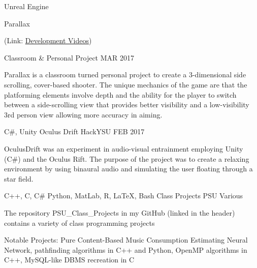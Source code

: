 
\vspace{-.5em}
\begin{cventries}

	\cventry
	{{\color{awesome} Unreal Engine}} %
	{Parallax \begin{footnotesize}{(Link: \href{https://www.youtube.com/playlist?list=PLJCbmN5AjE1XUlgY5KwFnwDh3gmhvtiSC}{\color{awesome}\underline{Development Videos}})}\end{footnotesize}} %
	{Classroom \& Personal Project} %
	{MAR 2017} %
	{
		\begin{cvitems} %
			\item {Parallax is a classroom turned personal project to create a 3-dimensional side scrolling, cover-based shooter. The unique mechanics of the game are that the platforming elements involve depth and the ability for the player to switch between a side-scrolling view that provides better visibility and a low-visibility 3rd person view allowing more accuracy in aiming.}
		\end{cvitems}
	}
	
	\cventry
	{{\color{awesome} C\#, Unity}} %
	{Oculus Drift} %
	{HackYSU} %
	{FEB 2017} %
	{
		\begin{cvitems} %
			\item {OculusDrift was an experiment in audio-visual entrainment employing Unity (C\#) and the Oculus Rift. The purpose of the project was to create a relaxing environment by using binaural audio and simulating the user floating through a star field.}
		\end{cvitems}
	}
	
	\cventry
	{{\color{awesome} C++, C, C\# Python, MatLab, R, LaTeX, Bash}} %
	{Class Projects} %
	{PSU} %
	{Various} %
	{
	\begin{cvitems} %
		\item {The repository PSU\_Class\_Projects in my GitHub (linked in the header) contains a variety of class programming projects 
		\item Notable Projects: Pure Content-Based Music Consumption Estimating Neural Network, pathfinding algorithms in C++ and Python, OpenMP algorithms in C++, MySQL-like DBMS recreation in C}
	\end{cvitems}
	}
	
\end{cventries}